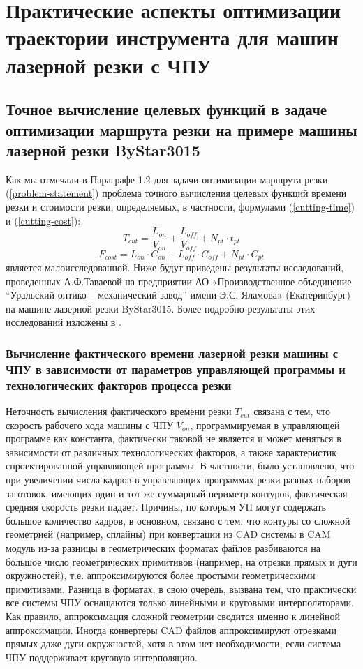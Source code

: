 \documentclass{article}
\begin{document}
\section{Практические аспекты оптимизации траектории инструмента для машин лазерной резки с ЧПУ}

\subsection{Точное вычисление целевых функций в задаче оптимизации маршрута резки на примере машины лазерной резки ByStar3015}

Как мы отмечали в Параграфе 1.2
для задачи оптимизации маршрута резки (\ref{problem-statement})
проблема точного вычисления целевых функций времени резки и стоимости резки,
определяемых, в частности, формулами (\ref{cutting-time}) и (\ref{cutting-cost}):
$$
T_{cut} = \frac{L_{on}}{V_{on}} + \frac{L_{off}}{V_{off}} +N_{pt} \cdot t_{pt}
$$
$$
F_{cost}=
L_{on} \cdot C_{on} +
L_{off} \cdot C_{off} +
N_{pt} \cdot C_{pt}
$$
является малоисследованной.
Ниже будут приведены результаты исследований,
проведенных А.Ф.Таваевой на предприятии
АО «Производственное объединение “Уральский оптико – механический завод”
имени Э.С. Яламова» (Екатеринбург)
на машине лазерной резки ByStar3015.
Более подробно результаты этих исследований изложены в
\cite{intro45,intro46,intro47}.

\subsubsection{Вычисление фактического времени лазерной резки машины с ЧПУ
в зависимости от параметров управляющей программы и технологических факторов процесса резки}

Неточность вычисления фактического времени резки
$T_{cut}$
связана с тем, что скорость рабочего хода машины с ЧПУ
$V_{on}$,
программируемая в управляющей программе как константа,
фактически таковой не является и может меняться
в зависимости от различных технологических факторов,
а также характеристик спроектированной управляющей программы.
В частности, было установлено,
что при увеличении числа кадров в управляющих программах
резки разных наборов заготовок,
имеющих один и тот же суммарный периметр контуров,
фактическая средняя скорость резки падает.
Причины, по которым УП могут содержать большое количество кадров,
в основном, связано с тем, что контуры со сложной геометрией
(например, сплайны) при конвертации из CAD системы в CAM
модуль из-за разницы в геометрических форматах файлов
разбиваются на большое число геометрических примитивов
(например, на отрезки прямых и дуги окружностей),
т.е. аппроксимируются более простыми геометрическими примитивами.
Разница в форматах, в свою очередь,
вызвана тем, что практически все системы ЧПУ
оснащаются только линейными и круговыми интерполяторами.
Как правило, аппроксимация сложной геометрии сводится
именно к линейной аппроксимации.
Иногда конвертеры CAD файлов аппроксимируют отрезками прямых
даже дуги окружностей, хотя в этом нет необходимости,
если система ЧПУ поддерживает круговую интерполяцию.
\end{document}
